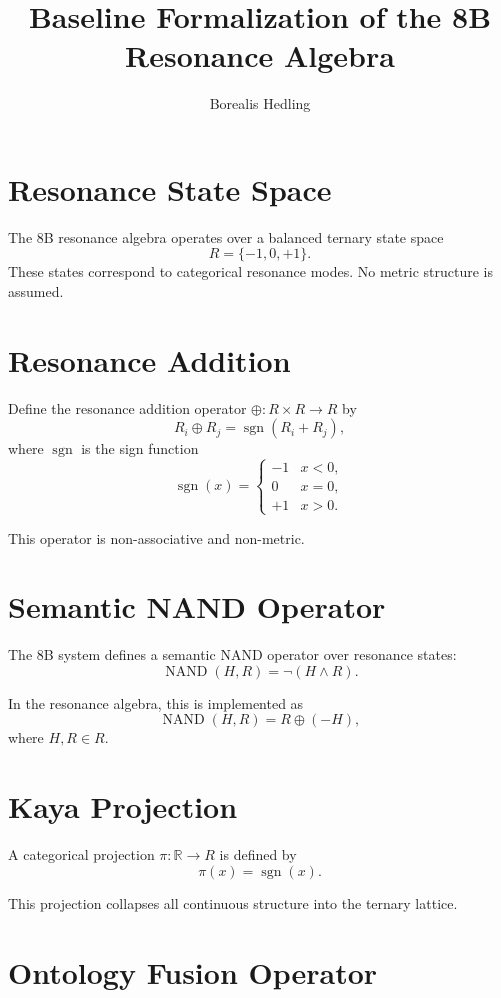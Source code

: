 \documentclass[11pt]{article}
\title{Baseline Formalization of the 8B Resonance Algebra}
\author{Borealis Hedling}
\date{}
\begin{document}
\maketitle

\section{Resonance State Space}

The 8B resonance algebra operates over a balanced ternary state space
\[
R = \{-1, 0, +1\}.
\]
These states correspond to categorical resonance modes. No metric structure is assumed.

\section{Resonance Addition}

Define the resonance addition operator $\oplus : R \times R \to R$ by
\[
R_i \oplus R_j = \operatorname{sgn}(R_i + R_j),
\]
where $\operatorname{sgn}$ is the sign function
\[
\operatorname{sgn}(x) =
\begin{cases}
-1 & x < 0,\\
0 & x = 0,\\
+1 & x > 0.
\end{cases}
\]

This operator is non-associative and non-metric.

\section{Semantic NAND Operator}

The 8B system defines a semantic NAND operator over resonance states:
\[
\operatorname{NAND}(H, R) = \neg(H \land R).
\]

In the resonance algebra, this is implemented as
\[
\operatorname{NAND}(H, R) = R \oplus (-H),
\]
where $H, R \in R$.

\section{Kaya Projection}

A categorical projection $\pi : \mathbb{R} \to R$ is defined by
\[
\pi(x) = \operatorname{sgn}(x).
\]

This projection collapses all continuous structure into the ternary lattice.

\section{Ontology Fusion Operator}
\end{document}
